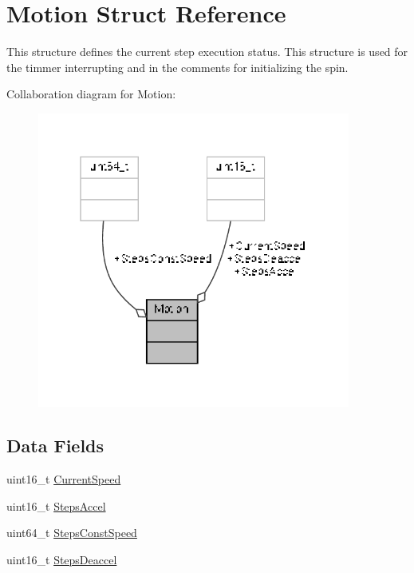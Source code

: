 \hypertarget{structMotion}{\section{Motion Struct Reference}
\label{structMotion}
}


This structure defines the current step execution status. This structure is used for the timmer interrupting and in the comments for initializing the spin.  




Collaboration diagram for Motion\-:
\nopagebreak
\begin{figure}[H]
\begin{center}
\leavevmode
\includegraphics[width=292pt]{structMotion__coll__graph}
\end{center}
\end{figure}
\subsection*{Data Fields}
\begin{DoxyCompactItemize}
\item 
uint16\-\_\-t \hyperlink{structMotion_a50860ebd661de5d104a36a92cd5f17c7}{Current\-Speed}
\item 
uint16\-\_\-t \hyperlink{structMotion_a970d0810aac5cab75c8dd0c95e4473da}{Steps\-Accel}
\item 
uint64\-\_\-t \hyperlink{structMotion_aa99fa8cb04ab25fc08e7b65664b7fdef}{Steps\-Const\-Speed}
\item 
uint16\-\_\-t \hyperlink{structMotion_a0d7942de8bba5304852a9f2d8fe833e5}{Steps\-Deaccel}
\end{DoxyCompactItemize}


